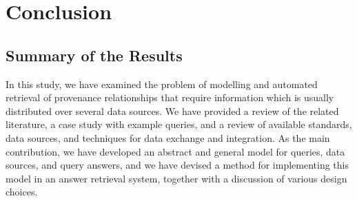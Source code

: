 \chapter{Conclusion}
\label{chap:conclusion}

\section{Summary of the Results}
\label{sec:summary}

In this study, we have examined the problem of modelling and automated retrieval of provenance relationships
that require information which is usually distributed over several data sources.
We have provided a review of the related literature,
a case study with example queries, and a review of available standards, data sources,
and techniques for data exchange and integration.
As the main contribution, we have developed an abstract and general model for queries,
data sources, and query answers, and we have devised a method for implementing this model
in an answer retrieval system, together with a discussion of various design choices.

